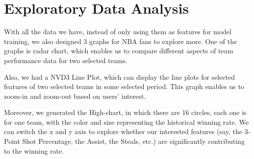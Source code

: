 \section{Exploratory Data Analysis}

With all the data we have, instead of only using them as features for model 
training, we also designed 3 graphs for NBA fans to explore more. 
One of the graphs is radar chart, which enables us to compare different 
aspects of team performance data for two selected teams. 

Also, we had a NVD3 Line Plot, which can display the line plots for selected
features of two selected teams in some selected period. This graph enables
us to zoom-in and zoom-out based on users’ interest. 

Moreover, we generated the High-chart, in which there are 16 circles, each one
is for one team, with the color and size representing the historical winning 
rate. We can switch the x and y axis to explore whether our interested features
(say, the 3-Point Shot Percentage, the Assist, the Steals, etc.) are 
significantly contributing to the winning rate. 


